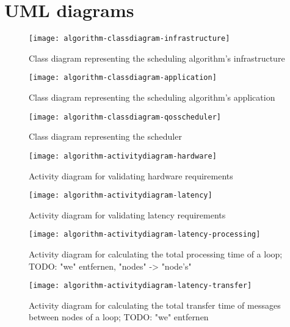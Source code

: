 \clearpage
\appendix

\chapter{UML diagrams\label{cha:algorithm-UML-diagrams}}

\begin{figure}[htb]
    \centering
    \texttt{[image: algorithm-classdiagram-infrastructure]}
    \caption{Class diagram representing the scheduling algorithm's infrastructure}
    \label{fig:classdiagram-infrastructure}
\end{figure}

\begin{figure}[htb]
    \centering
    \texttt{[image: algorithm-classdiagram-application]}
    \caption{Class diagram representing the scheduling algorithm's application}
    \label{fig:classdiagram-application}
\end{figure}

\begin{figure}[htb]
    \centering
    \texttt{[image: algorithm-classdiagram-qosscheduler]}
    \caption{Class diagram representing the scheduler}
    \label{fig:classdiagram-qosscheduler}
\end{figure}

\begin{figure}[htb]
    \centering
    \texttt{[image: algorithm-activitydiagram-hardware]}
    \caption{Activity diagram for validating hardware requirements}
    \label{fig:algorithm-activitydiagram-hardware}
\end{figure}


\begin{figure}[htb]
    \centering
    \texttt{[image: algorithm-activitydiagram-latency]}
    \caption{Activity diagram for validating latency requirements}
    \label{fig:algorithm-activitydiagram-latency}
\end{figure}

\begin{figure}[htb]
    \centering
    \texttt{[image: algorithm-activitydiagram-latency-processing]}
    \caption{Activity diagram for calculating the total processing time of a loop; TODO: "we" entfernen, "nodes" -> "node's"}
    \label{fig:algorithm-activitydiagram-latency-processing}
\end{figure}

\begin{figure}[htb]
    \centering
    \texttt{[image: algorithm-activitydiagram-latency-transfer]}
    \caption{Activity diagram for calculating the total transfer time of messages between nodes of a loop; TODO: "we" entfernen}
    \label{fig:algorithm-activitydiagram-latency-transfer}
\end{figure}

